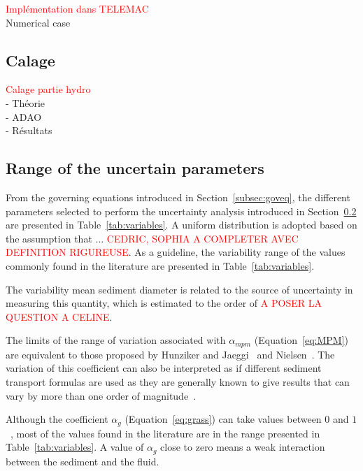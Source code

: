 \textcolor{red}{Implémentation dans TELEMAC} \\
Numerical case \\

\subsection{Calage}
\textcolor{red}{Calage partie hydro} \\
- Théorie \\
- ADAO \\
- Résultats


\subsection{Range of the uncertain parameters}
From the governing equations introduced in Section~\ref{subsec:goveq}, the different parameters selected to perform the uncertainty analysis introduced in Section~\ref{} are presented in Table~\ref{tab:variables}. A uniform distribution is adopted based on the assumption that ... \textcolor{red}{CEDRIC, SOPHIA A COMPLETER AVEC DEFINITION RIGUREUSE}. As a guideline, the variability range of the values commonly found in the literature are presented in Table~\ref{tab:variables}.

The variability mean sediment diameter is related to the source of uncertainty in measuring this quantity, which is estimated to the order of \textcolor{red}{A POSER LA QUESTION A CELINE}.

The limits of the range of variation associated with $\alpha_{mpm}$ (Equation~\ref{eq:MPM}) are equivalent to those proposed by Hunziker and Jaeggi~\cite{doi:10.1061/(ASCE)0733-9429(2002)128:12(1060)} and Nielsen~\cite{nielsen1992coastal}. The variation of this coefficient can also be interpreted as if different sediment transport formulas are used as they are generally known to give results that can vary by more than one order of magnitude~\cite{WRCR:WRCR12272}.

Although the coefficient $\alpha_g$ (Equation~\ref{eq:grass}) can take values between $0$ and $1$~\cite{diaz2008sediment}, most of the values found in the literature are in the range presented in Table~\ref{tab:variables}. A value of $\alpha_g$ close to zero means a weak interaction between the sediment and the fluid.

